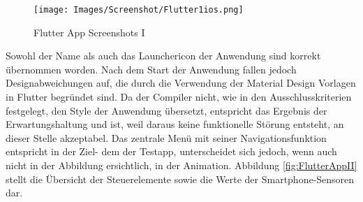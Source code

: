 \begin{figure}[!ht]
 \texttt{[image: Images/Screenshot/Flutter1ios.png]}
 \caption{Flutter App Screenshots I}
 \label{fig:FlutterAppI}
\end{figure}
 Sowohl der Name als auch das Launchericon der Anwendung sind korrekt übernommen worden.  Nach dem Start der Anwendung fallen jedoch Designabweichungen auf, die durch die Verwendung der Material Design Vorlagen in Flutter begründet sind.  Da der Compiler nicht,  wie in den Ausschlusskriterien festgelegt, den Style der Anwendung übersetzt,  entspricht das Ergebnis der Erwartungshaltung und ist,  weil daraus keine funktionelle Störung
entsteht,  an dieser Stelle akzeptabel.  Das zentrale Menü mit seiner Navigationsfunktion entspricht in der Ziel- dem der Testapp,  
unterscheidet sich jedoch,  wenn auch nicht in der Abbildung ersichtlich,  in der Animation. 
\newpage
Abbildung \ref{fig:FlutterAppII} stellt die Übersicht der Steuerelemente sowie die Werte der Smartphone-Sensoren dar.

